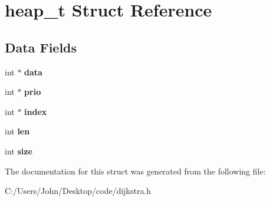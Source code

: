\hypertarget{structheap__t}{}\section{heap\+\_\+t Struct Reference}
\label{structheap__t}
\subsection*{Data Fields}
\begin{DoxyCompactItemize}
\item 
\mbox{\label{structheap__t_ac103627c1ad15cbec2f22d0abe6d54b6}} 
int $\ast$ {\bfseries data}
\item 
\mbox{\label{structheap__t_a07a9a7293a4880ff67652bddb5036f9f}} 
int $\ast$ {\bfseries prio}
\item 
\mbox{\label{structheap__t_a95e9e0f8a692321b83a2e0ce2789c485}} 
int $\ast$ {\bfseries index}
\item 
\mbox{\label{structheap__t_afed088663f8704004425cdae2120b9b3}} 
int {\bfseries len}
\item 
\mbox{\label{structheap__t_a439227feff9d7f55384e8780cfc2eb82}} 
int {\bfseries size}
\end{DoxyCompactItemize}


The documentation for this struct was generated from the following file\+:\begin{DoxyCompactItemize}
\item 
C\+:/\+Users/\+John/\+Desktop/code/dijkstra.\+h\end{DoxyCompactItemize}

